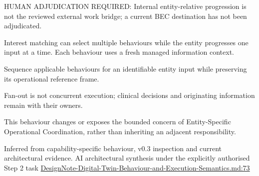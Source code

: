 HUMAN ADJUDICATION REQUIRED: Internal entity-relative progression is not the reviewed external work bridge; a current BEC destination has not been adjudicated.



Interest matching can select multiple behaviours while the entity progresses one input at a time. Each behaviour uses a fresh managed information context.



Sequence applicable behaviours for an identifiable entity input while preserving its operational reference frame.



Fan-out is not concurrent execution; clinical decisions and originating information remain with their owners.



This behaviour changes or exposes the bounded concern of Entity-Specific Operational Coordination, rather than inheriting an adjacent responsibility.


Inferred from capability-specific behaviour, v0.3 inspection and current architectural evidence. AI architectural synthesis under the explicitly authorised Step 2 task \hyperref[evidence:ec6250f7cf7c29a5]{DesignNote-Digital-Twin-Behaviour-and-Execution-Semantics.md:73}
